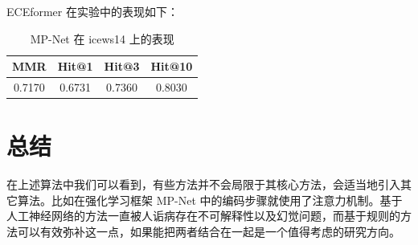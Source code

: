 \documentclass[a4paper, AutoFakeBold]{article}
\begin{document}
ECEformer 在实验中的表现如下：




\begin{table}[htbp]
	\centering
	\caption{MP-Net 在 icews14 上的表现}
	\begin{tabular}{cccc}
		\toprule  %
		MMR&Hit@1&Hit@3&Hit@10 \\ 
		\midrule  %
		0.7170&0.6731&0.7360&0.8030 \\
		\bottomrule  %
	\end{tabular}
\end{table}






\section{总结}

在上述算法中我们可以看到，有些方法并不会局限于其核心方法，会适当地引入其它算法。比如在强化学习框架 MP-Net 中的编码步骤就使用了注意力机制。基于人工神经网络的方法一直被人诟病存在不可解释性以及幻觉问题，而基于规则的方法可以有效弥补这一点，如果能把两者结合在一起是一个值得考虑的研究方向。





\end{document}
